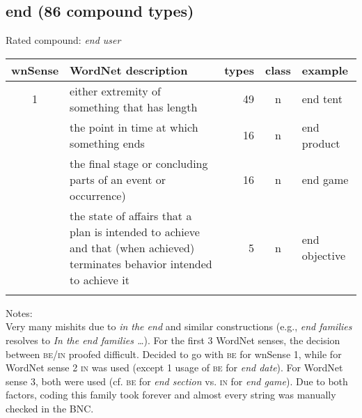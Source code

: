 \subsection{end          (86 compound types)}
Rated compound: \emph{end user}

\vspace*{.5ex}

\noindent
\begin{longtable}{c>{\raggedright\arraybackslash}p{5cm}rc>{\raggedright\arraybackslash}p{2cm}}\lsptoprule
{\small wnSense}&WordNet description&types&class&example\\\midrule
1&either extremity of something that has length&49&n&end tent\\\tablevspace
2&the point in time at which something ends&16&n&end product\\\tablevspace
3&the final stage or concluding parts of an event or occurrence)&16&n&end game\\\tablevspace
4&the state of affairs that a plan is intended to achieve and that (when achieved) terminates behavior intended to achieve it&5&n& end objective\\\lspbottomrule
\end{longtable}
\enlargethispage{1\baselineskip}
\noindent
Notes:\\
Very many mishits due to \emph{in the end} and similar constructions (e.g.,
\emph{end families} resolves to \emph{In the end families \dots}). For
the first 3 WordNet senses, the decision between \textsc{be}/\textsc{in} proofed
difficult. Decided to go with \textsc{be} for wnSense 1, while for WordNet
sense 2 \textsc{in} was used (except 1 usage of \textsc{be} for \emph{end date}). For
WordNet sense 3, both were used (cf. \textsc{be} for \emph{end section} 
vs. \textsc{in} for \emph{end game}). Due to both factors, coding this family
took forever and almost every string was manually checked in the BNC. 


